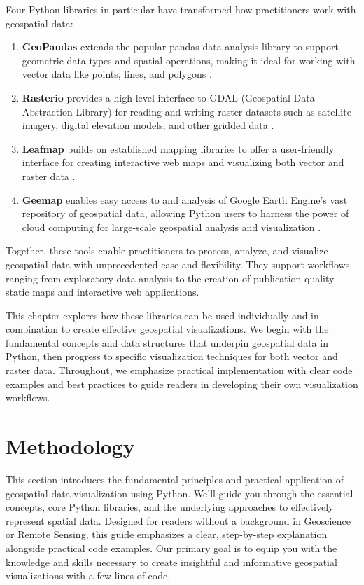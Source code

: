 Four Python libraries in particular have transformed how practitioners work with geospatial data:

\begin{enumerate}
\item \textbf{GeoPandas} extends the popular pandas data analysis library to support geometric data types and spatial operations, making it ideal for working with vector data like points, lines, and polygons \citep{Joris2024}.

\item \textbf{Rasterio} provides a high-level interface to GDAL (Geospatial Data Abstraction Library) for reading and writing raster datasets such as satellite imagery, digital elevation models, and other gridded data \citep{Gillies2019}.

\item \textbf{Leafmap} builds on established mapping libraries to offer a user-friendly interface for creating interactive web maps and visualizing both vector and raster data \citep{Wu2021}.

\item \textbf{Geemap} enables easy access to and analysis of Google Earth Engine's vast repository of geospatial data, allowing Python users to harness the power of cloud computing for large-scale geospatial analysis and visualization \citep{Wu2020}.
\end{enumerate}

Together, these tools enable practitioners to process, analyze, and visualize geospatial data with unprecedented ease and flexibility. They support workflows ranging from exploratory data analysis to the creation of publication-quality static maps and interactive web applications.

This chapter explores how these libraries can be used individually and in combination to create effective geospatial visualizations. We begin with the fundamental concepts and data structures that underpin geospatial data in Python, then progress to specific visualization techniques for both vector and raster data. Throughout, we emphasize practical implementation with clear code examples and best practices to guide readers in developing their own visualization workflows.

\section{Methodology}\label{sec:Method}

This section introduces the fundamental principles and practical application of geospatial data visualization using Python. We'll guide you through the essential concepts, core Python libraries, and the underlying approaches to effectively represent spatial data. Designed for readers without a background in Geoscience or Remote Sensing, this guide emphasizes a clear, step-by-step explanation alongside practical code examples. Our primary goal is to equip you with the knowledge and skills necessary to create insightful and informative geospatial visualizations with a few lines of code.

